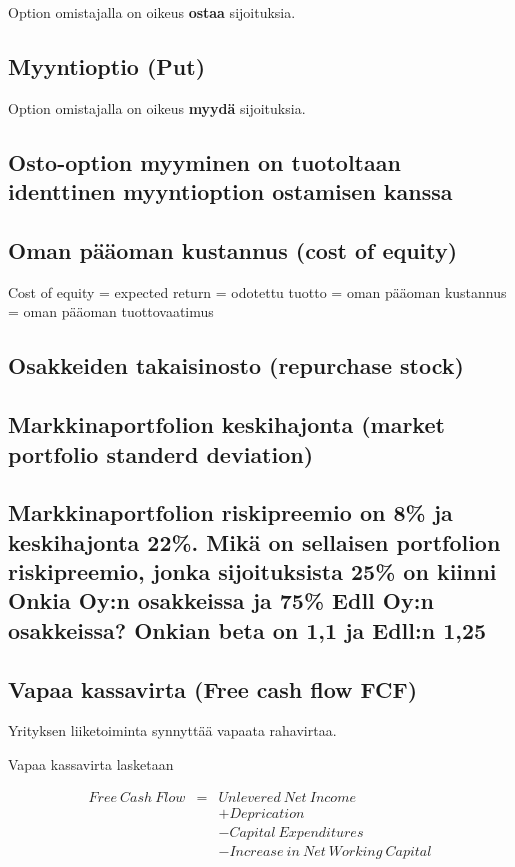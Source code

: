 \documentclass[a4paper]{article}
\begin{document}
Option omistajalla on oikeus \textbf{ostaa} sijoituksia.

\subsection{Myyntioptio (Put)}

Option omistajalla on oikeus \textbf{myydä} sijoituksia.

\subsection{Osto-option myyminen on tuotoltaan identtinen myyntioption ostamisen kanssa}



\subsection{Oman pääoman kustannus (cost of equity)}

Cost of equity = expected return = odotettu tuotto = oman pääoman kustannus = oman pääoman tuottovaatimus

\subsection{Osakkeiden takaisinosto (repurchase stock)}

\subsection{Markkinaportfolion keskihajonta (market portfolio standerd deviation)}



\subsection{Markkinaportfolion riskipreemio on 8\% ja keskihajonta 22\%. Mikä on sellaisen portfolion riskipreemio, jonka sijoituksista 25\% on kiinni Onkia Oy:n osakkeissa ja 75\% Edll Oy:n osakkeissa? Onkian beta on 1,1 ja Edll:n 1,25}

\subsection{Vapaa kassavirta (Free cash flow FCF)}

Yrityksen liiketoiminta synnyttää vapaata rahavirtaa.

Vapaa kassavirta lasketaan

\[
\begin{array}{lcl}
Free\ Cash\ Flow & = & Unlevered\ Net\ Income \\
 & & + Deprication \\
 & & - Capital\ Expenditures \\
 & & - Increase\ in\ Net\ Working\ Capital \\
\end{array}
\]
\end{document}
